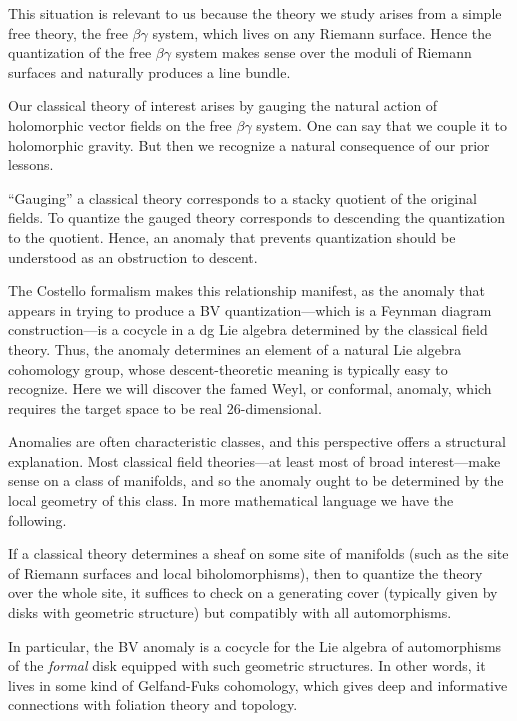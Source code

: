 This situation is relevant to us because the theory we study arises from a simple free theory,
the free $\beta\gamma$ system, which lives on any Riemann surface.
Hence the quantization of the free $\beta\gamma$ system makes sense over the moduli of Riemann surfaces and naturally produces a line bundle.

Our classical theory of interest arises by gauging the natural action of holomorphic vector fields on the free $\beta\gamma$ system.
One can say that we couple it to holomorphic gravity.
But then we recognize a natural consequence of our prior lessons.

\begin{lesson}
``Gauging'' a classical theory corresponds to a stacky quotient of the original fields. 
To quantize the gauged theory corresponds to descending the quantization to the quotient.
Hence, an anomaly that prevents quantization should be understood as an obstruction to descent.
\end{lesson}

The Costello formalism makes this relationship manifest, 
as the anomaly that appears in trying to produce a BV quantization---which is a Feynman diagram construction---is a cocycle in a dg Lie algebra determined by the classical field theory.
Thus, the anomaly determines an element of a natural Lie algebra cohomology group,
whose descent-theoretic meaning is typically easy to recognize.
Here we will discover the famed Weyl, or conformal, anomaly, which requires the target space to be real 26-dimensional. 

Anomalies are often characteristic classes, and this perspective offers a structural explanation.
Most classical field theories---at least most of broad interest---make sense on a class of manifolds,
and so the anomaly ought to be determined by the local geometry of this class.
In more mathematical language we have the following.

\begin{lesson}
If a classical theory determines a sheaf on some site of manifolds (such as the site of Riemann surfaces and local biholomorphisms), 
then to quantize the theory over the whole site, 
it suffices to check on a generating cover (typically given by disks with geometric structure) but compatibly with all automorphisms.
\end{lesson}

In particular, the BV anomaly is a cocycle for the Lie algebra of automorphisms of the {\em formal} disk equipped with such geometric structures.
In other words, it lives in some kind of Gelfand-Fuks cohomology, which gives deep and informative connections with foliation theory and topology.

